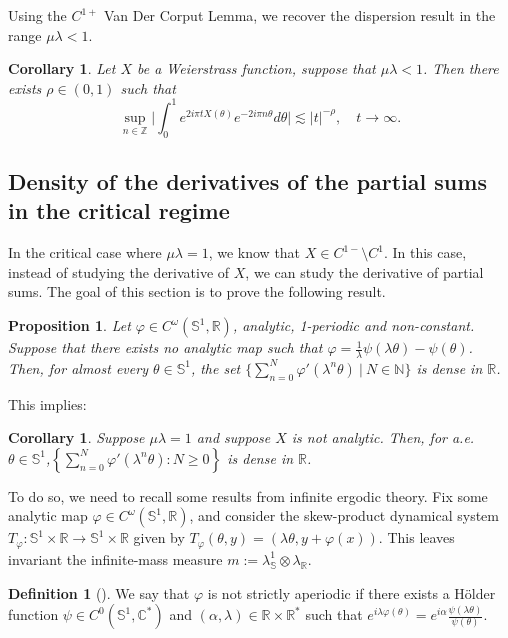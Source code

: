 \documentclass[11pt]{amsart}
\renewcommand{\phi}{\varphi}
\theoremstyle{plain}
\newtheorem{proposition}[theorem]{Proposition}
\newtheorem{corollary}[theorem]{Corollary}
\theoremstyle{definition}
\newtheorem{definition}[theorem]{Definition}
\numberwithin{equation}{section}
\begin{document}
Using the $C^{1+}$ Van Der Corput Lemma, we recover the dispersion result in the range $\mu \lambda < 1$.

\begin{corollary}
Let $X$ be a Weierstrass function, suppose that $\mu \lambda < 1$. Then there exists $\rho \in (0,1)$ such that
$$ \sup_{n \in \mathbb{Z}} \Big| \int_0^1 e^{2 i \pi t X(\theta)} e^{-2 i \pi n \theta} d\theta \Big| \lesssim |t|^{-\rho}, \quad t \to \infty.$$
\end{corollary}

\subsection{Density of the derivatives of the partial sums in the critical regime}

In the critical case where $\mu \lambda = 1$, we know that $X \in C^{1-} \setminus C^1$. In this case, instead of studying the derivative of $X$, we can study the derivative of partial sums. The goal of this section is to prove the following result.

\begin{proposition}\label{prop:density}
Let $\varphi \in C^\omega(\mathbb{S}^1,\mathbb{R})$, analytic, 1-periodic and non-constant. Suppose that there exists no analytic map such that $\varphi = \frac{1}{\lambda} \psi(\lambda \theta)-\psi(\theta)$. Then, for almost every $\theta \in \mathbb{S}^1$, the set 
$ \Big\{ \sum_{n=0}^N \varphi'(\lambda^n \theta) \ | \ N \in \mathbb{N} \Big\} $
is dense in $\mathbb{R}$.
\end{proposition}

This implies:

\begin{corollary}
Suppose $\mu\lambda=1$ and suppose $X$ is not analytic. Then, for
a.e. $\theta\in\mathbb S^1$,$ \left\{\sum_{n=0}^N \varphi'(\lambda^n\theta):N\geq0\right\}$
is dense in $\mathbb R$.
\end{corollary}

To do so, we need to recall some results from infinite ergodic theory. Fix some analytic map $\phi \in C^\omega(\mathbb{S}^1,\mathbb{R})$, and  consider the skew-product dynamical system $T_\phi:\mathbb{S}^1 \times \mathbb{R} \rightarrow \mathbb{S}^1 \times \mathbb{R} $ given by $T_\phi(\theta,y)=(\lambda \theta,y+\phi(x))$. This leaves invariant the infinite-mass measure $m := \lambda_\mathbb{S}^1 \otimes \lambda_{\mathbb{R}}$.

\begin{definition}[\cite{Gu89}]
We say that $\phi$ is not strictly aperiodic if there exists a Hölder function $\psi \in C^0(\mathbb{S}^1,\mathbb{C}^*)$ and $(\alpha,\lambda) \in \mathbb{R} \times \mathbb{R}^*$ such that $e^{i \lambda \phi(\theta)} = e^{i \alpha} \frac{\psi(\lambda \theta)}{\psi(\theta)} $.
\end{definition}
\end{document}
